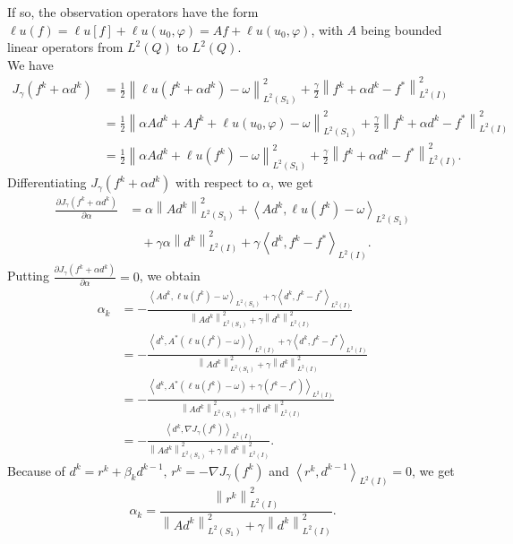 \documentclass[]{article}
\begin{document}
\noindent If so, the observation operators have the form $\ell u(f)=\ell u[f]+\ell u(u_0, \varphi)=Af+\ell u(u_0, \varphi)$, with $A$ being bounded linear operators from $L^2(Q)$ to $L^2(Q)$.\\
We have
\begin{align*}
	J_{\gamma}(f^k+\alpha d^k)&=\frac{1}{2}\left\|\ell u(f^k+\alpha d^k)-\omega\right\|_{L^2(S_1)}^2+\frac{\gamma}{2}\left\|f^k+\alpha d^k-f^*\right\|_{L^2(I)}^2\\[0.2cm]
	&=\frac{1}{2}\left\|\alpha Ad^k+Af^k+\ell u(u_0, \varphi)-\omega\right\|_{L^2(S_1)}^2+\frac{\gamma}{2}\left\|f^k+\alpha d^k-f^*\right\|_{L^2(I)}^2\\[0.2cm]
	&=\frac{1}{2}\left\|\alpha Ad^k+\ell u(f^k)-\omega\right\|_{L^2(S_1)}^2+\frac{\gamma}{2}\left\|f^k+\alpha d^k-f^*\right\|_{L^2(I)}^2.
\end{align*}
Differentiating $J_\gamma(f^k+\alpha d^k)$ with respect to $\alpha$, we get
\begin{align*}
\frac{\partial J_\gamma(f^k+\alpha d^k)}{\partial \alpha} &= \alpha\left\|Ad^k \right\|_{L^2(S_1)}^2+\left\langle Ad^k,\ell u(f^k)-\omega\right\rangle_{L^2(S_1)}\\[0.2cm]
&\quad+\gamma\alpha\left\| d^k\right\|_{L^2(I)}^2+\gamma\left\langle d^k, f^k-f^*\right\rangle_{L^2(I)}.
\end{align*}
Putting $\frac{\partial J_\gamma(f^k+\alpha d^k)}{\partial \alpha}=0$, we obtain
\begin{align*}
\alpha_k&=-\frac{\left\langle Ad^k, \ell u(f^k)-\omega\right\rangle_{L^2(S_1)}+\gamma\left\langle d^k, f^k-f^*\right\rangle_{L^2(I)}}{\left\|Ad^k\right\|^2_{L^2(S_1)}+\gamma\left\|d^k\right\|^2_{L^2(I)}}\\[0.2cm]
&=-\frac{\left\langle d^k, A^*\left(\ell u(f^k)-\omega\right)\right\rangle_{L^2(I)}+\gamma\left\langle d^k, f^k-f^*\right\rangle_{L^2(I)}}{\left\|Ad^k\right\|^2_{L^2(S_1)}+\gamma\left\|d^k\right\|^2_{L^2(I)}}\\[0.2cm]
&=-\frac{\left\langle d^k, A^*\left(\ell u(f^k)-\omega\right)+\gamma(f^k-f^*)\right\rangle_{L^2(I)}}{\left\|Ad^k\right\|^2_{L^2(S_1)}+\gamma\left\|d^k\right\|^2_{L^2(I)}}\\[0.2cm]
&=-\frac{\left\langle d^k,\nabla J_\gamma(f^k)\right\rangle_{L^2(I)}}{\left\|Ad^k\right\|^2_{L^2(S_1)}+\gamma\left\|d^k\right\|^2_{L^2(I)}}.
\end{align*}
Because of $d^k=r^k+\beta_kd^{k-1},\, r^k=-\nabla J_\gamma (f^k)$ and $\left\langle r^k,d^{k-1}\right\rangle_{L^2(I)}=0$, we get 
$$\alpha_k=\frac{\left\|r^k\right\|^2_{L^2(I)}}{\left\|Ad^k\right\|^2_{L^2(S_1)}+\gamma\left\|d^k\right\|^2_{L^2(I)}}.$$
\end{document}
